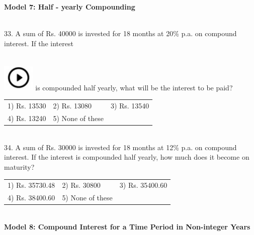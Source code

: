 \documentclass{article}
\begin{document}
	\noindent 
	
	\noindent \textbf{Model 7: Half - yearly Compounding}
	
	\noindent 
	
	\noindent 
	
	\noindent  \\ 33. A sum of Rs. 40000 is invested for 18 months at 20\% p.a. on compound interest. If the interest
	
	\noindent  
\noindent \\ \includegraphics*[width=0.60in, height=0.52in]{images/image1} is compounded half yearly, what will be the interest to be paid?
	
	\noindent \begin{tabular}{p{1.7in} p{1.6in} p{1.6in}} \\ 
 1) Rs. 13530               &  2) Rs. 13080        &  3) Rs. 13540        \\
4) Rs. 13240        & 5) None of these  \\
\end{tabular}
	
	\noindent 
	
	\noindent 
	
	\noindent 
	
	\noindent  \\ 34. A sum of Rs. 30000 is invested for 18 months at 12\% p.a. on compound interest. If the interest is compounded half yearly, how much does it become on maturity?
	
	\noindent \begin{tabular}{p{1.7in} p{1.6in} p{1.6in}} \\ 
 1) Rs. 35730.48          &  2) Rs. 30800        &  3) Rs. 35400.60   \\
4) Rs. 38400.60   & 5) None of these  \\
\end{tabular}
	
	\noindent 
	
	\noindent 
	
	\noindent 
	
	\noindent \\  \textbf{Model 8: Compound Interest for a Time Period in Non-integer Years}
	
	\noindent 
	
	\noindent 
	
\end{document}
